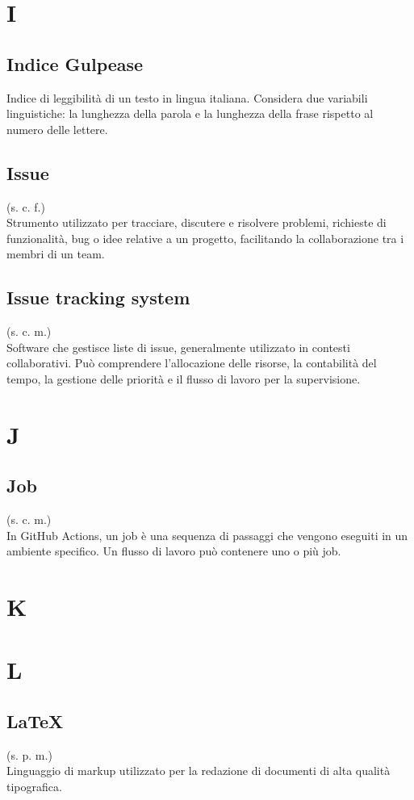 \section{I}
\subsection{Indice Gulpease}
Indice di leggibilità di un testo in lingua italiana. Considera due variabili
linguistiche: la lunghezza della parola e la lunghezza della frase rispetto al
numero delle lettere.
\subsection{Issue}
\label{Issue}
(s. c. f.)\\
Strumento utilizzato per tracciare, discutere e risolvere problemi, richieste di funzionalità,
bug o idee relative a un progetto, facilitando la collaborazione tra i membri di un team.
\subsection{Issue tracking system}
(s. c. m.)\\
Software che gestisce liste di issue, generalmente utilizzato in contesti collaborativi.
Può comprendere l'allocazione delle risorse, la contabilità del tempo, la gestione delle
priorità e il flusso di lavoro per la supervisione.
\pagebreak
\section{J}
\subsection{Job}
(s. c. m.)\\
In GitHub Actions, un job è una sequenza di passaggi che vengono eseguiti
in un ambiente specifico. Un flusso di lavoro può contenere uno o più job.
\pagebreak
\section{K}
\pagebreak
\section{L}
\subsection{LaTeX}
\label{LaTeX}
(s. p. m.)\\
Linguaggio di markup utilizzato per la redazione di documenti di alta qualità tipografica.
\pagebreak
